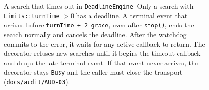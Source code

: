 \documentclass[11pt,a4paper]{article}
\newcommand{\code}[1]{\texttt{#1}}
\newcommand{\file}[1]{\texttt{#1}}
\begin{document}
\begin{figure}[tbp]
\centering
{}
\caption{A search that times out in \code{DeadlineEngine}. Only a search with
  \code{Limits::turnTime} $> 0$ has a deadline. A terminal event that arrives before
  \code{turnTime + 2 grace}, even after \code{stop()}, ends the search normally and cancels the
  deadline. After the watchdog commits to the error, it waits for any active callback to return.
  The decorator refuses new searches until it begins the timeout callback and drops the late
  terminal event. If that event never arrives, the decorator stays \code{Busy} and the caller
  must close the transport
  (\file{docs/audit/AUD-03}).}
\label{fig:deadline}
\end{figure}
\end{document}

